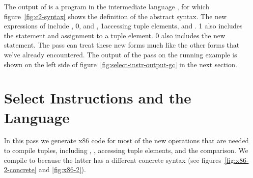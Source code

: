 \documentclass[7x10]{TimesAPriori_MIT}%
\def\racketEd{0}
\def\pythonEd{1}
\def\edition{1}
\newcommand{\racket}[1]{{\if\edition\racketEd{#1}\fi}}
\newcommand{\pythonColor}[0]{}
\newcommand{\python}[1]{{\if\edition\pythonEd\pythonColor #1\fi}}
\numberwithin{theorem}{chapter}
\numberwithin{definition}{chapter}
\numberwithin{equation}{chapter}
\begin{document}
The output of  is a program in the
intermediate language \LangCVec{}, for which figure~\ref{fig:c2-syntax}
shows the definition of the abstract syntax.
%
%
The new expressions of \LangCVec{} include ,
%
\racket{, and ,}
%
\python{accessing tuple elements,}
%
and .
%
\python{\LangCVec{} also includes the  statement and
assignment to a tuple element.}
%
\racket{\LangCVec{} also includes the new \code{collect} statement.}
%
The  pass can treat these new forms much like
the other forms that we've already encountered.  The output of the
 pass on the running example is shown on the
left side of figure~\ref{fig:select-instr-output-gc} in the next
section.


\section{Select Instructions and the \LangXGlobal{} Language}
\label{sec:select-instructions-gc}


In this pass we generate x86 code for most of the new operations that
are needed to compile tuples, including ,
, accessing tuple elements, and the 
comparison.
%
We compile  to  because the latter has a
different concrete syntax (see figures~\ref{fig:x86-2-concrete} and
\ref{fig:x86-2}).  
\end{document}
